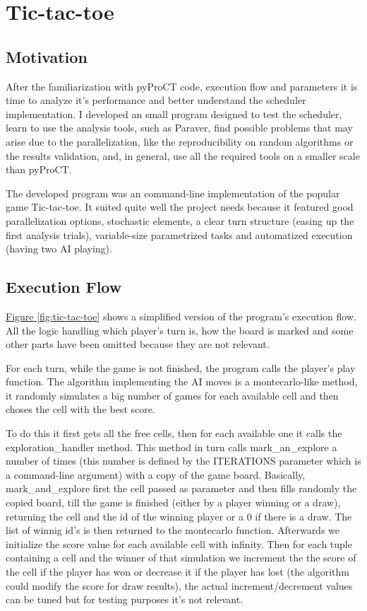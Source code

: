\chapter{Tic-tac-toe}
\label{chap:ttt}

\section{Motivation}

After the familiarization with pyProCT code, execution flow and parameters it is time to analyze it's performance and better understand the scheduler implementation. I developed an small program designed to test the scheduler, learn to use the analysis tools, such as Paraver, find possible problems that may arise due to the parallelization, like the reproducibility on random algorithms or the results validation, and, in general, use all the required tools on a smaller scale than pyProCT. 

The developed program was an command-line implementation of the popular game Tic-tac-toe. It suited quite well the project needs because it featured good parallelization options, stochastic elements, a clear turn structure (easing up the first analysis trials), variable-size parametrized tasks and automatized execution (having two AI playing).

\section{Execution Flow}

\hyperref[fig:tic-tac-toe]{Figure \ref{fig:tic-tac-toe}} shows a simplified version of the program's execution flow. All the logic handling which player's turn is, how the board is marked and some other parts have been omitted because they are not relevant. 

For each turn, while the game is not finished, the program calls the player's play function. The algorithm implementing the AI moves is a montecarlo-like method, it randomly simulates a big number of games for each available cell and then choses the cell with the best score.

To do this it first gets all the free cells, then for each available one it calls the exploration\_handler method. This method in turn calls mark\_an\_explore a number of times (this number is defined by the ITERATIONS parameter which is a command-line argument) with a copy of the game board. Basically, mark\_and\_explore first the cell passed as parameter and then fills randomly the copied board, till the game is finished (either by a player winning or a draw), returning the cell and the id of the winning player or a 0 if there is a draw. The list of winnig id's is then returned to the montecarlo function. Afterwards we initialize the score value for each available cell with infinity. Then for each tuple containing a cell and the winner of that simulation we increment the the score of the cell if the player has won or decrease it if the player has lost (the algorithm could modify the score for draw results), the actual increment/decrement values can be tuned but for testing purposes it's not relevant. 

